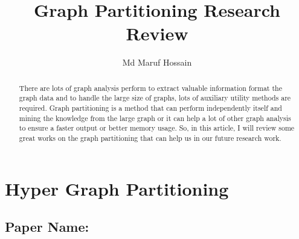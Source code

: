 \documentclass[conference, onecolumn]{IEEEtran}
\begin{document}
\title{Graph Partitioning Research Review}


\author{Md Maruf Hossain}

\maketitle

\begin{abstract}
There are lots of graph analysis perform to extract valuable information format the graph data and to handle the large 
size of graphs, lots of auxiliary utility methods are required. Graph partitioning is a method that can perform 
independently itself and mining the knowledge from the large graph or it can help a lot of other graph analysis to 
ensure a faster output or better memory usage. So, in this article, I will review some great works on the graph partitioning 
that can help us in our future research work.    
\end{abstract}

\section{Hyper Graph Partitioning}
\subsection{Paper Name: } 
\end{document}
